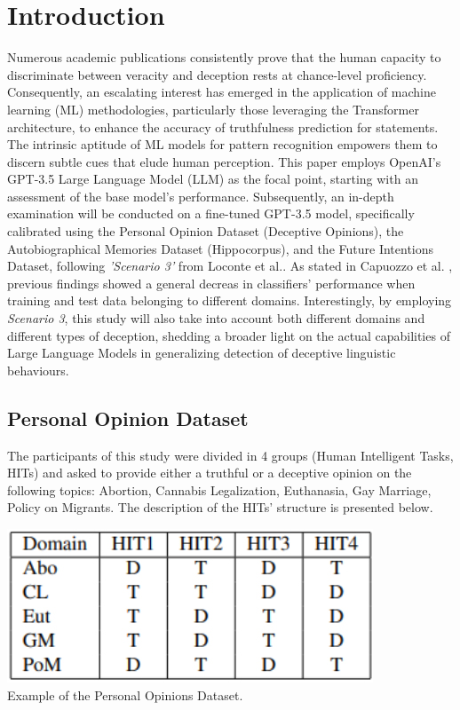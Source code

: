 \documentclass[10pt,twocolumn,letterpaper]{article}
\begin{document}
\section{Introduction}
Numerous academic publications consistently prove that the human capacity to discriminate 
between veracity and deception rests at chance-level proficiency. Consequently, an escalating 
interest has emerged in the application of machine learning (ML) methodologies, particularly 
those leveraging the Transformer architecture, to enhance the accuracy of truthfulness prediction for statements. 
The intrinsic aptitude of ML models for pattern recognition empowers them to discern subtle cues 
that elude human perception. This paper employs OpenAI's GPT-3.5 Large Language Model (LLM) 
as the focal point, starting with an assessment of the base model's performance. Subsequently, 
an in-depth examination will be conducted on a fine-tuned GPT-3.5 model, specifically calibrated using the 
Personal Opinion Dataset (Deceptive Opinions), the Autobiographical Memories Dataset (Hippocorpus), and the 
Future Intentions Dataset, following \textit{'Scenario 3'} from Loconte et al.\cite{Loconte}.
As stated in Capuozzo et al. \cite{Capuozzo}, previous findings showed a general decreas in classifiers'
performance when training and test data belonging to different domains. Interestingly, by employing \textit{Scenario 3},
this study will also take into account both different domains and different types of deception, shedding a broader light
on the actual capabilities of Large Language Models in generalizing detection of deceptive linguistic behaviours.

\subsection{Personal Opinion Dataset}

The participants of this study \cite{Capuozzo} were divided in 4 groups (Human Intelligent Tasks, HITs) and asked to provide either 
a truthful or a deceptive opinion on the following topics: Abortion, Cannabis Legalization, Euthanasia, Gay Marriage, Policy on Migrants.
The description of the HITs' structure is presented below. \\

\begin{center}
\includegraphics[scale=0.40]{img/pers_op_dataset.jpg} \\
\small {Example of the Personal Opinions Dataset.}
\end{center}
\end{document}
